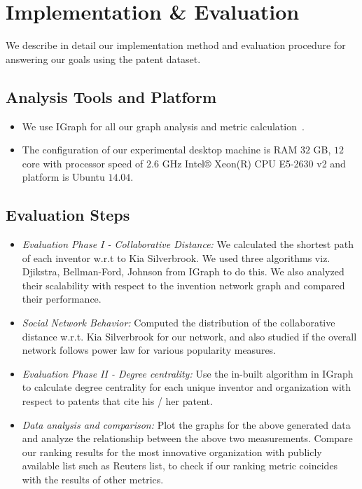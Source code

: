 \section{Implementation \& Evaluation}
\label{sec:eval}


We describe in detail our implementation method and evaluation procedure for
answering  our goals using the patent dataset. 

\subsection{Analysis Tools and Platform}


	\begin{itemize}
		\item We use IGraph for all our graph analysis and metric
		calculation~\cite{gephi, igraph}. 
		
		\item The configuration of our experimental desktop machine is RAM $32$ GB, $12$
		core with processor speed of $2.6$ GHz Intel® Xeon(R) CPU E5-2630 v2 and platform is Ubuntu $14.04$.
	\end{itemize}



\subsection{Evaluation Steps}
	\begin{itemize}
		\item {\em Evaluation Phase I - Collaborative Distance:} We calculated the 
		shortest path of each inventor w.r.t to Kia Silverbrook. We used three
		algorithms viz. Djikstra, Bellman-Ford, Johnson from IGraph to do this. We
		also analyzed their scalability with respect to the invention network graph
		and compared their performance.
		\item {\em Social Network Behavior:} Computed the distribution of the 
		collaborative distance w.r.t. Kia Silverbrook for our network, and also studied
		if the overall network follows power law for various popularity measures.
		\item {\em Evaluation Phase II - Degree centrality:} Use the in-built
		algorithm in IGraph to calculate degree centrality
		for each unique inventor and organization with respect to patents that cite his / her patent.
		\item {\em Data analysis and comparison:} Plot the graphs for the above
		generated data and analyze the relationship between the above two
		measurements. Compare our ranking results for the most innovative organization
		with publicly available list such as Reuters list, to check if our ranking
		metric coincides with the results of other metrics.
	\end{itemize}



